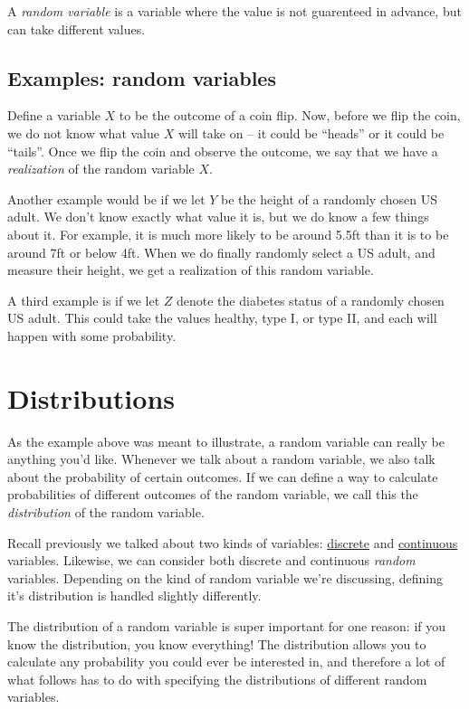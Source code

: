 \documentclass[]{book}
\theoremstyle{definition}
\theoremstyle{definition}
\theoremstyle{definition}
\theoremstyle{remark}
\begin{document}
A \emph{random variable} is a variable where the value is not guarenteed in advance, but can take different values.

\hypertarget{examples-random-variables}{%
\subsection{Examples: random variables}\label{examples-random-variables}}

Define a variable \(X\) to be the outcome of a coin flip. Now, before we flip the coin, we do not know what value \(X\) will take on -- it could be ``heads'' or it could be ``tails''. Once we flip the coin and observe the outcome, we say that we have a \emph{realization} of the random variable \(X\).

Another example would be if we let \(Y\) be the height of a randomly chosen US adult. We don't know exactly what value it is, but we do know a few things about it. For example, it is much more likely to be around 5.5ft than it is to be around 7ft or below 4ft. When we do finally randomly select a US adult, and measure their height, we get a realization of this random variable.

A third example is if we let \(Z\) denote the diabetes status of a randomly chosen US adult. This could take the values healthy, type I, or type II, and each will happen with some probability.

\hypertarget{distributions}{%
\section{Distributions}\label{distributions}}

As the example above was meant to illustrate, a random variable can really be anything you'd like. Whenever we talk about a random variable, we also talk about the probability of certain outcomes. If we can define a way to calculate probabilities of different outcomes of the random variable, we call this the \emph{distribution} of the random variable.

Recall previously we talked about two kinds of variables: \protect\hyperlink{discrete}{discrete} and \protect\hyperlink{continuous}{continuous} variables. Likewise, we can consider both discrete and continuous \emph{random} variables. Depending on the kind of random variable we're discussing, defining it's distribution is handled slightly differently.

The distribution of a random variable is super important for one reason: if you know the distribution, you know everything! The distribution allows you to calculate any probability you could ever be interested in, and therefore a lot of what follows has to do with specifying the distributions of different random variables.
\end{document}
